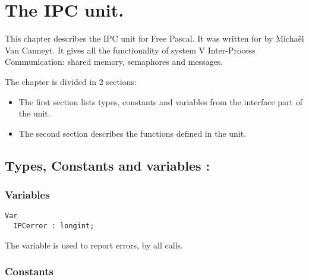 %
%
%
%
%
\chapter{The IPC unit.}
This chapter describes the IPC unit for Free Pascal. It was written for
\linux by Micha\"el Van Canneyt. It gives all the functionality of system V 
Inter-Process Communication: shared memory, semaphores and messages.

The chapter is divided in 2 sections:
\begin{itemize}
\item The first section lists types, constants and variables from the
interface part of the unit.
\item The second section describes the functions defined in the unit.
\end{itemize}
\section {Types, Constants and variables : }
\subsection{Variables}

\begin{verbatim}
Var
  IPCerror : longint;
\end{verbatim}
The  variable is used to report errors, by all calls.
\subsection{Constants}

